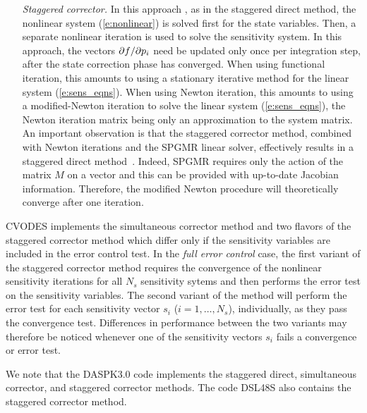 \begin{itemize}
\item[{\em Staggered corrector.}] In this approach \cite{FTB:97}, as in the staggered direct method,
  the nonlinear system (\ref{e:nonlinear}) is solved first for the state variables.
  Then, a separate nonlinear iteration is used to solve the sensitivity system.
  In this approach, the vectors $\partial f / \partial p_i$ need be updated only once per integration step, 
  after the state correction phase has converged. 
  When using functional iteration, this amounts to using a stationary iterative method for
  the linear system (\ref{e:sens_eqns}). When using Newton iteration, this amounts to 
  using a modified-Newton iteration to solve the linear system (\ref{e:sens_eqns}), 
  the Newton iteration matrix being only an approximation to the system matrix.
  An important observation is that the staggered corrector method, combined with 
  Newton iterations and the SPGMR linear solver, effectively results in a staggered direct 
  method~\cite{Toc:01}.
  Indeed, SPGMR requires only the action of the matrix $M$ on a vector and
  this can be provided with up-to-date Jacobian information. Therefore, the
  modified Newton procedure will theoretically converge 
  after one iteration.

\end{itemize}  
CVODES implements the simultaneous corrector method and two flavors of the 
staggered corrector method which differ only if the sensitivity variables are
included in the error control test.
In the {\em full error control} case, 
the first variant of the staggered corrector method requires the convergence of 
the nonlinear sensitivity iterations for all $N_s$ sensitivity sytems and then 
performs the error test on the sensitivity variables. The second variant of the method
will perform the error test for each sensitivity vector $s_i$ ($i=1,\ldots,N_s$),
individually, as they pass the convergence test. Differences in performance
between the two variants may therefore be noticed whenever one of the sensitivity 
vectors $s_i$ fails a convergence or error test. 

We note that the DASPK3.0 code \cite{LiPe:99b,LiPe:99a} implements the staggered
direct, simultaneous corrector, and staggered corrector methods. The code
DSL48S \cite{FTB:97,Fee:98} also contains the staggered corrector method.


